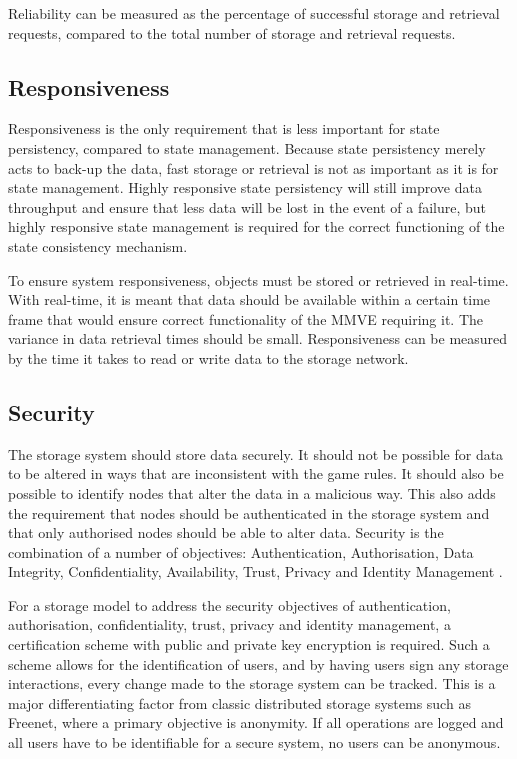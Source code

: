 Reliability can be measured as the percentage of successful storage and retrieval requests, compared to the total number of storage and retrieval requests.

\subsection{Responsiveness}
\label{char_responsiveness}

Responsiveness is the only requirement that is less important for state persistency, compared to state management. Because state persistency merely acts to back-up the data, fast storage or retrieval is not as important as it is for state management. Highly responsive state persistency will still improve data throughput and ensure that less data will be lost in the event of a failure, but highly responsive state management is required for the correct functioning of the state consistency mechanism.

To ensure system responsiveness, objects must be stored or retrieved in real-time. With real-time, it is meant that data should be available within a
certain time frame that would ensure correct functionality of the MMVE requiring it. The variance in data retrieval times should be small. Responsiveness can be measured by the time it takes to read or write data to the storage network.

\subsection{Security}
\label{characteristics_security}

The storage system should store data securely. It should not be possible for data to be altered in ways that are inconsistent with the game rules. It
should also be possible to identify nodes that alter the data in a malicious way. This also adds the requirement that nodes should be authenticated
in the storage system and that only authorised nodes should be able to alter data. Security is the combination of a number of objectives:
Authentication, Authorisation, Data Integrity, Confidentiality, Availability, Trust, Privacy and Identity Management
\cite{distributed_systems_security}.

For a storage model to address the security objectives of authentication, authorisation, confidentiality, trust, privacy and identity
management, a certification scheme with public and private key encryption is required. Such a scheme allows for the identification of users, and by
having users sign any storage interactions, every change made to the storage system can be tracked. This is a major differentiating factor from
classic distributed storage systems such as Freenet, where a primary objective is anonymity. If all operations are logged and all users have to be
identifiable for a secure system, no users can be anonymous.

